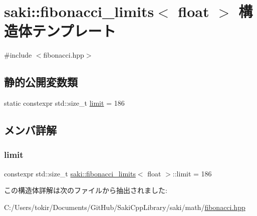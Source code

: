 \hypertarget{structsaki_1_1fibonacci__limits_3_01float_01_4}{}\section{saki\+:\+:fibonacci\+\_\+limits$<$ float $>$ 構造体テンプレート}
\label{structsaki_1_1fibonacci__limits_3_01float_01_4}


{\ttfamily \#include $<$fibonacci.\+hpp$>$}

\subsection*{静的公開変数類}
\begin{DoxyCompactItemize}
\item 
static constexpr std\+::size\+\_\+t \mbox{\hyperlink{structsaki_1_1fibonacci__limits_3_01float_01_4_a09a84eea4e6748cc662670d0bfcc74d5}{limit}} = 186
\end{DoxyCompactItemize}


\subsection{メンバ詳解}
\mbox{\label{structsaki_1_1fibonacci__limits_3_01float_01_4_a09a84eea4e6748cc662670d0bfcc74d5}} 
\subsubsection{\texorpdfstring{limit}{limit}}
{\footnotesize\ttfamily constexpr std\+::size\+\_\+t \mbox{\hyperlink{structsaki_1_1fibonacci__limits}{saki\+::fibonacci\+\_\+limits}}$<$ float $>$\+::limit = 186\hspace{0.3cm}{\ttfamily [static]}}



この構造体詳解は次のファイルから抽出されました\+:\begin{DoxyCompactItemize}
\item 
C\+:/\+Users/tokir/\+Documents/\+Git\+Hub/\+Saki\+Cpp\+Library/saki/math/\mbox{\hyperlink{fibonacci_8hpp}{fibonacci.\+hpp}}\end{DoxyCompactItemize}
